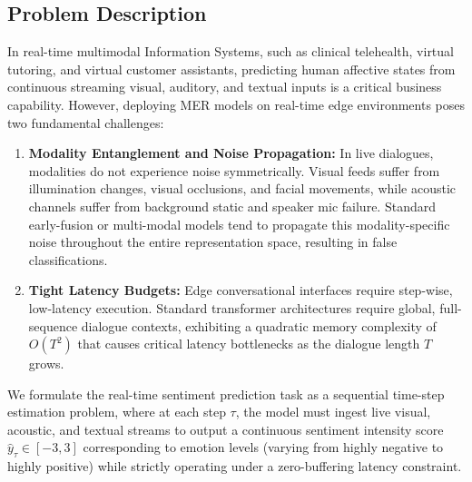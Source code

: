 \documentclass[sn-mathphys,Numbered]{sn-jnl}
\theoremstyle{thmstyleone}
\theoremstyle{thmstyletwo}
\theoremstyle{thmstylethree}
\begin{document}
\subsection{Problem Description}\label{subsec:case_problem}
In real-time multimodal Information Systems, such as clinical telehealth, virtual tutoring, and virtual customer assistants, predicting human affective states from continuous streaming visual, auditory, and textual inputs is a critical business capability. However, deploying MER models on real-time edge environments poses two fundamental challenges:
\begin{enumerate}
    \item \textbf{Modality Entanglement and Noise Propagation:} In live dialogues, modalities do not experience noise symmetrically. Visual feeds suffer from illumination changes, visual occlusions, and facial movements, while acoustic channels suffer from background static and speaker mic failure. Standard early-fusion or multi-modal models tend to propagate this modality-specific noise throughout the entire representation space, resulting in false classifications.
    \item \textbf{Tight Latency Budgets:} Edge conversational interfaces require step-wise, low-latency execution. Standard transformer architectures require global, full-sequence dialogue contexts, exhibiting a quadratic memory complexity of $O(T^2)$ that causes critical latency bottlenecks as the dialogue length $T$ grows.
\end{enumerate}
We formulate the real-time sentiment prediction task as a sequential time-step estimation problem, where at each step $\tau$, the model must ingest live visual, acoustic, and textual streams to output a continuous sentiment intensity score $\hat{y}_{\tau} \in [-3, 3]$ corresponding to emotion levels (varying from highly negative to highly positive) while strictly operating under a zero-buffering latency constraint.
\end{document}
